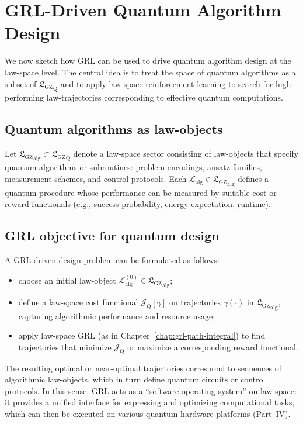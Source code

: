 \documentclass[11pt]{book}
\newcommand{\GZLS}{\ensuremath{\mathfrak{L}_{\mathrm{GZ}}}}
\theoremstyle{plain}
\theoremstyle{definition}
\theoremstyle{remark}
\begin{document}
\section{GRL-Driven Quantum Algorithm Design}
\label{sec:grl-driven-qc-design}


We now sketch how GRL can be used to drive quantum algorithm design
at the law-space level. The central idea is to treat the space of
quantum algorithms as a subset of ${\GZLS}_{\mathrm{Q}}$ and to apply
law-space reinforcement learning to search for high-performing
law-trajectories corresponding to effective quantum computations.

\subsection*{Quantum algorithms as law-objects}

Let ${\GZLS}_{\mathrm{alg}} \subset {\GZLS}_{\mathrm{Q}}$ denote a
law-space sector consisting of law-objects that specify quantum
algorithms or subroutines: problem encodings, ansatz families,
measurement schemes, and control protocols. Each
$\mathcal{L}_{\mathrm{alg}} \in {\GZLS}_{\mathrm{alg}}$ defines a
quantum procedure whose performance can be measured by suitable
cost or reward functionals (e.g., success probability, energy
expectation, runtime).

\subsection*{GRL objective for quantum design}

A GRL-driven design problem can be formulated as follows:
\begin{itemize}
  \item choose an initial law-object
        $\mathcal{L}_{\mathrm{alg}}^{(0)} \in {\GZLS}_{\mathrm{alg}}$;
  \item define a law-space cost functional
        $\mathcal{J}_{\mathrm{Q}}[\gamma]$ on trajectories
        $\gamma(\cdot)$ in ${\GZLS}_{\mathrm{alg}}$, capturing
        algorithmic performance and resource usage;
  \item apply law-space GRL (as in Chapter~\ref{chap:grl-path-integral})
        to find trajectories that minimize $\mathcal{J}_{\mathrm{Q}}$
        or maximize a corresponding reward functional.
\end{itemize}

The resulting optimal or near-optimal trajectories correspond to
sequences of algorithmic law-objects, which in turn define quantum
circuits or control protocols. In this sense, GRL acts as a
``software operating system'' on law-space: it provides a unified
interface for expressing and optimizing computational tasks, which
can then be executed on various quantum hardware platforms
(Part~IV).
\end{document}
